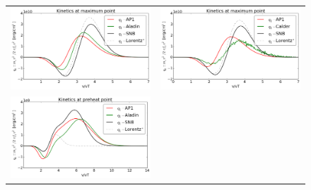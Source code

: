 \begin{figure}[htb]
\begin{center}
\begin{tabular}{cc}
      \includegraphics[width=\figscale\textwidth]{../VFPdata/C7_Aladin_case5_kinetics.png} 
	  &
      \includegraphics[width=\figscale\textwidth]{../VFPdata/C7_Calder_case5_kinetics.png} 
	  \\
	  \includegraphics[width=\figscale\textwidth]{../VFPdata/C7_Aladin_case5_nonlocal_kinetics.png} 
      &

\end{tabular}
\end{center}
\end{figure}
